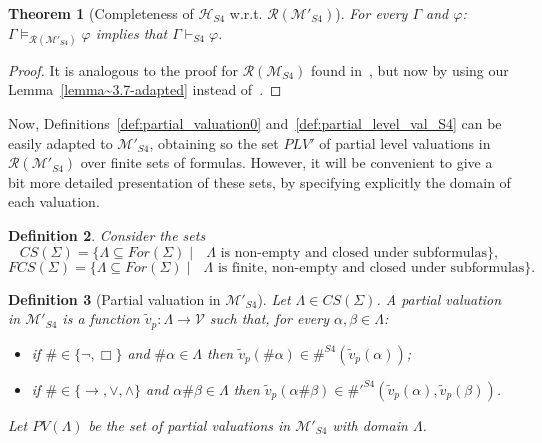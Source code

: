 \documentclass[12pt]{article}
\newtheorem{theorem}{Theorem}[section]
\newtheorem{definition}[theorem]{Definition}
\begin{document}
\begin{theorem} [Completeness  of $\mathcal{H}_{S4}$ w.r.t.  $\mathcal{R}(\mathcal{M}'_{S4})$] \label{thm:compl:S4N}
For every $\Gamma$ and $\varphi$: $\Gamma  \models_{\mathcal{R}(\mathcal{M}'_{S4})} \varphi$ implies that  $\Gamma \vdash_{S4} \varphi$.
\end{theorem}
\begin{proof}
It is analogous to the proof for $\mathcal{R}(\mathcal{M}_{S4})$ found in~\cite[Lemma~3.9 and Theorem~3.10]{gratz_truth_2022}, but now by using our Lemma~\ref{lemma~3.7-adapted} instead of~\cite[Lemma~3.7]{gratz_truth_2022}.
\end{proof}

Now, Definitions~\ref{def:partial_valuation0} and~\ref{def:partial_level_val_S4} can be easily adapted to   $\mathcal{M}'_{S4}$, obtaining so the set $PLV'$ of partial level valuations in $\mathcal{R}(\mathcal{M}'_{S4})$ over finite sets of formulas. However, it will be convenient to give a bit more detailed presentation of these sets, by specifying explicitly the domain of each valuation.

\begin{definition} Consider the sets 
$$CS(\Sigma)= \{\Lambda \subseteq For(\Sigma) \mid  \mbox{ $\Lambda$ is non-empty and closed under subformulas}\},$$
 $$FCS(\Sigma)= \{\Lambda \subseteq For(\Sigma) \mid  \mbox{ $\Lambda$ is finite, non-empty and closed under subformulas}\}.$$
\end{definition}


\begin{definition}[Partial valuation  in $\mathcal{M}'_{S4}$]\label{def:partial_valuationN}
 Let $\Lambda \in CS(\Sigma)$.  A partial valuation in $\mathcal{M}'_{S4}$ is a function $\tilde v_p :\Lambda \rightarrow \mathcal{V}$ such that, for every $\alpha,\beta \in \Lambda$:
 
 \begin{itemize}
 \item[--] if $\# \in \{\neg,\Box\}$ and  $\#\alpha \in \Lambda$ then $\tilde v_p(\#\alpha) \in \#^{S4}(\tilde v_p(\alpha))$;
 \item[--] if  $\# \in \{\to,\vee,\land\}$ and $\alpha \# \beta\in \Lambda$ then  $\tilde v_p(\alpha \# \beta) \in \#'^{S4}(\tilde v_p(\alpha),\tilde v_p(\beta))$.
 \end{itemize}
 Let $PV(\Lambda)$ be the set of  partial valuations in $\mathcal{M}'_{S4}$ with domain $\Lambda$.
\end{definition}
\end{document}
